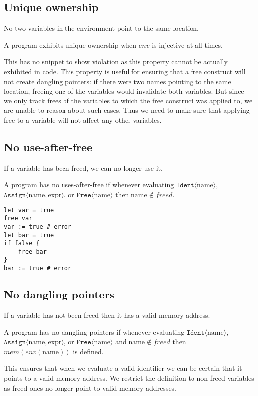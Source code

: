 \subsection{Unique ownership}\label{sec:properties-uniqown}

No two variables in the environment point to the same location.

\begin{definition}
    A program exhibits unique ownership when $env$ is injective at all times.
\end{definition}

This has no snippet to show violation as this property cannot be actually exhibited in code. This property is useful for ensuring that a free construct will not create dangling pointers: if there were two names pointing to the same location, freeing one of the variables would invalidate both variables. But since we only track frees of the variables to which the free construct was applied to, we are unable to reason about such cases. Thus we need to make sure that applying free to a variable will not affect any other variables.

\subsection{No use-after-free}\label{sec:properties-useafterfree}

If a variable has been freed, we can no longer use it.

\begin{definition}
    A program has no uses-after-free if whenever evaluating $\texttt{Ident}\langle \text{name} \rangle$, $\texttt{Assign}\langle \text{name}, \text{expr} \rangle$, or $\texttt{Free}\langle \text{name} \rangle$ then $\text{name} \notin freed$.
\end{definition}

\begin{lstlisting}
let var = true
free var
var := true # error
let bar = true
if false {
    free bar
}
bar := true # error
\end{lstlisting}

\subsection{No dangling pointers}\label{sec:properties-danglingptr}

If a variable has not been freed then it has a valid memory address.

\begin{definition}
    A program has no dangling pointers if whenever evaluating $\texttt{Ident}\langle \text{name} \rangle$, $\texttt{Assign}\langle \text{name}, \text{expr} \rangle$, or $\texttt{Free}\langle \text{name} \rangle$ and $\text{name} \notin freed$ then $mem(env(\text{name}))$ is defined.
\end{definition}


This ensures that when we evaluate a valid identifier we can be certain that it points to a valid memory address. We restrict the definition to non-freed variables as freed ones no longer point to valid memory addresses.
